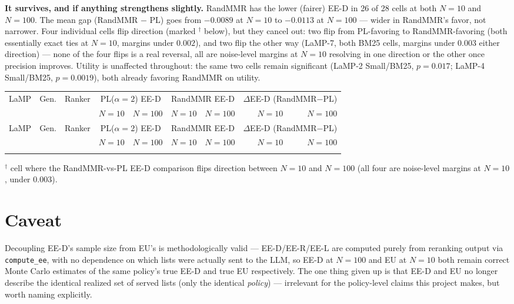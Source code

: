 \documentclass[10pt]{article}
\begin{document}
\textbf{It survives, and if anything strengthens slightly.} RandMMR has the lower
(fairer) EE-D in 26 of 28 cells at both $N{=}10$ and $N{=}100$. The mean gap
(RandMMR $-$ PL) goes from $-0.0089$ at $N{=}10$ to $-0.0113$ at $N{=}100$ --- wider in
RandMMR's favor, not narrower. Four individual cells flip direction (marked
$^\dagger$ below), but they cancel out: two flip from PL-favoring to RandMMR-favoring
(both essentially exact ties at $N{=}10$, margins under $0.002$), and two flip the
other way (LaMP-7, both BM25 cells, margins under $0.003$ either direction) --- none
of the four flips is a real reversal, all are noise-level margins at $N{=}10$ resolving
in one direction or the other once precision improves. Utility is unaffected throughout:
the same two cells remain significant (LaMP-2 Small/BM25, $p{=}0.017$; LaMP-4
Small/BM25, $p{=}0.0019$), both already favoring RandMMR on utility.

\FloatBarrier
\begin{longtable}{c l l cc cc rr}
\toprule
LaMP & Gen. & Ranker & \multicolumn{2}{c}{PL($\alpha{=}2$) EE-D} & \multicolumn{2}{c}{RandMMR EE-D} & \multicolumn{2}{c}{$\Delta$EE-D (RandMMR$-$PL)} \\
 & & & $N{=}10$ & $N{=}100$ & $N{=}10$ & $N{=}100$ & $N{=}10$ & $N{=}100$ \\
\midrule
\endfirsthead
\toprule
LaMP & Gen. & Ranker & \multicolumn{2}{c}{PL($\alpha{=}2$) EE-D} & \multicolumn{2}{c}{RandMMR EE-D} & \multicolumn{2}{c}{$\Delta$EE-D (RandMMR$-$PL)} \\
 & & & $N{=}10$ & $N{=}100$ & $N{=}10$ & $N{=}100$ & $N{=}10$ & $N{=}100$ \\
\midrule
\endhead
\bottomrule
\endlastfoot

\end{longtable}
\noindent $^\dagger$ cell where the RandMMR-vs-PL EE-D comparison flips direction between $N{=}10$ and $N{=}100$ (all four are noise-level margins at $N{=}10$, under $0.003$).

\section{Caveat}

Decoupling EE-D's sample size from EU's is methodologically valid --- EE-D/EE-R/EE-L
are computed purely from reranking output via \texttt{compute\_ee}, with no
dependence on which lists were actually sent to the LLM, so EE-D at $N{=}100$ and EU
at $N{=}10$ both remain correct Monte Carlo estimates of the same policy's true EE-D
and true EU respectively. The one thing given up is that EE-D and EU no longer
describe the identical realized set of served lists (only the identical
\emph{policy}) --- irrelevant for the policy-level claims this project makes, but
worth naming explicitly.
\end{document}
